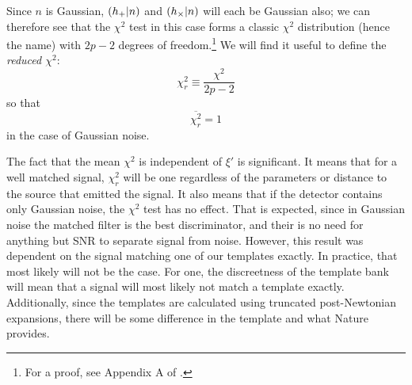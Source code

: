 Since $n$ is Gaussian, $(h_{+}|n)$ and $(h_{\times}|n)$ will each be Gaussian also; we can therefore see that the $\chi^2$ test in this case forms a classic $\chi^2$ distribution (hence the name) with $2p -2$ degrees of freedom.\footnote{For a proof, see Appendix A of \cite{Allen:2004}.} We will find it useful to define the \emph{reduced $\chi^2$}:
\begin{equation}
\label{eqn:reduced_chisq}
\chi^2_{r} \equiv \frac{\chi^2}{2p - 2}
\end{equation}
so that
\begin{equation*}
\overline{\chi^2_{r}} = 1
\end{equation*}
in the case of Gaussian noise.

The fact that the mean $\chi^2$ is independent of $\xi'$ is significant. It means that for a well matched signal, $\chi^2_r$ will be one regardless of the parameters or distance to the source that emitted the signal. It also means that if the detector contains only Gaussian noise, the $\chi^2$ test has no effect. That is expected, since in Gaussian noise the matched filter is the best discriminator, and their is no need for anything but \ac{SNR} to separate signal from noise. However, this result was dependent on the signal matching one of our templates exactly. In practice, that most likely will not be the case. For one, the discreetness of the template bank will mean that a signal will most likely not match a template exactly. Additionally, since the templates are calculated using truncated post-Newtonian expansions, there will be some difference in the template and what Nature provides.

